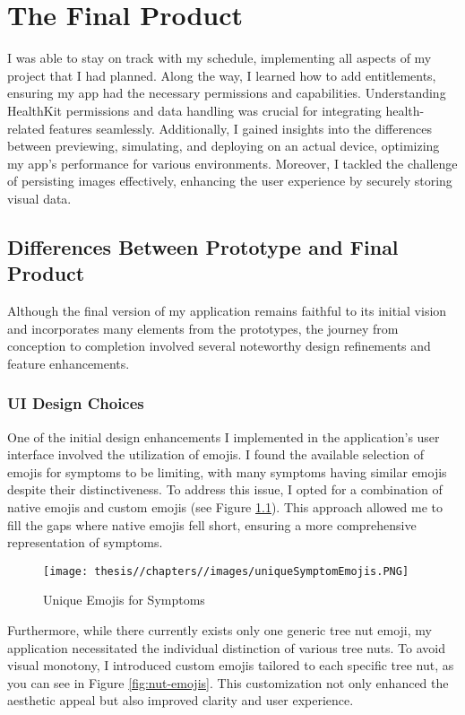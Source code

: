 \chapter{The Final Product}

I was able to stay on track with my schedule, implementing all aspects of my project that I had planned. Along the way, I learned how to add entitlements, ensuring my app had the necessary permissions and capabilities. Understanding HealthKit permissions and data handling was crucial for integrating health-related features seamlessly. Additionally, I gained insights into the differences between previewing, simulating, and deploying on an actual device, optimizing my app's performance for various environments. Moreover, I tackled the challenge of persisting images effectively, enhancing the user experience by securely storing visual data.

\section{Differences Between Prototype and Final Product}

Although the final version of my application remains faithful to its initial vision and incorporates many elements from the prototypes, the journey from conception to completion involved several noteworthy design refinements and feature enhancements.

\subsection{UI Design Choices}

One of the initial design enhancements I implemented in the application's user interface involved the utilization of emojis. I found the available selection of emojis for symptoms to be limiting, with many symptoms having similar emojis despite their distinctiveness. To address this issue, I opted for a combination of native emojis and custom emojis (see Figure \ref{fig:emojis}). This approach allowed me to fill the gaps where native emojis fell short, ensuring a more comprehensive representation of symptoms.

\begin{figure} [H]
    \centering
    \texttt{[image: thesis//chapters//images/uniqueSymptomEmojis.PNG]}
    \caption{Unique Emojis for Symptoms}
    \label{fig:emojis}
\end{figure}

Furthermore, while there currently exists only one generic tree nut emoji, my application necessitated the individual distinction of various tree nuts. To avoid visual monotony, I introduced custom emojis tailored to each specific tree nut, as you can see in Figure \ref{fig:nut-emojis}. This customization not only enhanced the aesthetic appeal but also improved clarity and user experience.

